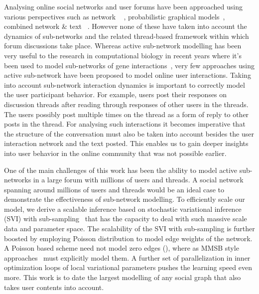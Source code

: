 \documentclass{sig-alternate}
\begin{document}
Analysing online social networks and user forums have been approached using
various perspectives such as network ~\cite{Shi:2000:NCI:351581.351611,
Shi00learningsegmentation} , probabilistic 
graphical models~\cite{ Airoldi:2008:MMS:1390681.1442798}, 
combined network \& text 
~\cite{Ho:2012:DHT:2187836.2187936,Nallapati:2008:JLT:1401890.1401957}. 
However none of these have taken
into account the dynamics of sub-networks and the related thread-based framework
within which forum discussions take place. Whereas
active sub-network modelling has been very useful to the research in
computational biology in recent years where it's been used to model sub-networks
of gene interactions~\cite{journals/ploscb/DeshpandeSVHM10,Lichtenstein:Charleston},
very few approaches using active sub-network have been proposed to model online
 user interactions. Taking into account sub-network interaction
dynamics is important to correctly model the user participant behavior. For
example, users post their
responses on discussion threads after reading through responses of
other users in the threads. The users possibly post multiple times on the thread
 as a form of reply to other posts in the thread. For analysing such
 interactions it becomes imperative that the structure of the conversation must also be taken
into account  besides the user interaction network and the
text posted. This enables us to gain deeper insights into user behavior in the
online community that was not possible earlier. 

One of the main challenges of this work has been the ability to model
active sub-networks in a large forum with millions of users and
threads. A social network spanning around millions of users and threads would 
be an ideal case to demonstrate the effectiveness of sub-network
modelling.
To efficiently scale our model, we derive a scalable inference based on
stochastic variational inference (SVI) with sub-sampling~\cite{Hoffman:2013:SVI} 
that has the capacity to deal with such massive scale data and parameter space.
 The scalability of the SVI
with sub-sampling is further boosted by employing Poisson distribution 
to model edge weights of
the network. A Poisson based scheme need not model zero edges
(\cite{Kerrer:Newman}), where as MMSB style approaches~\cite{Airoldi:2008:MMS:1390681.1442798}
 must explicitly model them.
A further set of
parallelization in inner optimization loops of local variational parameters
pushes the learning speed even more. This work is to date the largest 
modelling of any social graph that also takes user contents into
account. 
\end{document}
